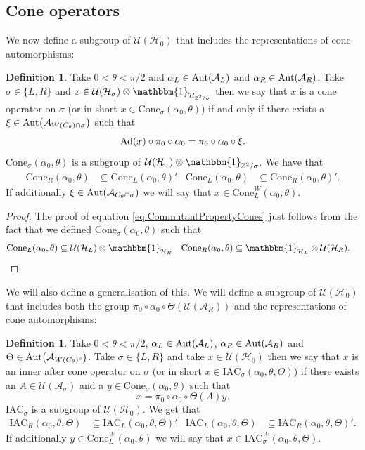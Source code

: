 \documentclass[12pt,a4paper,twoside]{article}
\newcommand{\IAC}{\textrm{IAC}}
\let\originalleft\left
\let\originalright\right
\renewcommand{\left}{\mathopen{}\mathclose\bgroup\originalleft}
\renewcommand{\right}{\aftergroup\egroup\originalright}
\newcommand{\UU}{\mathcal U}
\newcommand{\HH}{\mathcal H}
\newcommand{\ZZ}{\mathbb Z}
\renewcommand{\AA}{\mathcal A}
\newcommand{\id}{\mathbbm{1}}
\newcommand{\Ad}[1]{\textrm{Ad}\left(#1\right)}
\newcommand{\Aut}[1]{\textrm{Aut}\left(#1\right)}
\theoremstyle{definition}
\newtheorem{definition}[theorem]{Definition}
\numberwithin{equation}{section}
\begin{document}
\subsection{Cone operators}
 We now define a subgroup of $\UU(\HH_0)$ that includes the representations of cone automorphisms:
\begin{definition}\label{def:ConeOperators}
	Take $0<\theta<\pi/2$ and $\alpha_L\in\Aut{\AA_{L}}$ and $\alpha_R\in\Aut{\AA_{R}}$. Take $\sigma\in\{L,R\}$ and $x\in\UU(\HH_{\sigma})\otimes\id_{\HH_{\ZZ^2/\sigma}}$ then we say that $x$ is a cone operator on $\sigma$ (or in short $x\in\textrm{Cone}_{\sigma}(\alpha_0,\theta)$) if and only if there exists a $\xi\in\Aut{\AA_{W(C_\theta)\cap\sigma}}$ such that
	\begin{equation}
		\Ad{x}\circ\pi_0\circ\alpha_0=\pi_0\circ\alpha_0\circ\xi.
	\end{equation}
	$\textrm{Cone}_\sigma(\alpha_0,\theta)$ is a subgroup of $\UU(\HH_\sigma)\otimes\id_{\ZZ^2/\sigma}$. We have that
	\begin{align}\label{eq:CommutantPropertyCones}
		\textrm{Cone}_R(\alpha_0,\theta)&\subseteq\textrm{Cone}_L(\alpha_0,\theta)'&\textrm{Cone}_L(\alpha_0,\theta)&\subseteq\textrm{Cone}_R(\alpha_0,\theta)'.
	\end{align}
	If additionally $\xi\in\Aut{\AA_{C_\theta\cap\sigma}}$ we will say that $x\in\textrm{Cone}_L^W(\alpha_0,\theta)$.
\end{definition}
\begin{proof}
	The proof of equation \eqref{eq:CommutantPropertyCones} just follows from the fact that we defined $\textrm{Cone}_\sigma(\alpha_0,\theta)$ such that
	\begin{align}
		\textrm{Cone}_L(\alpha_0,\theta)&\subseteq \UU(\HH_L)\otimes\id_{\HH_R}&\textrm{Cone}_R(\alpha_0,\theta)&\subseteq \id_{\HH_L} \otimes \UU(\HH_R).
	\end{align}
\end{proof}
We will also define a generalisation of this. We will define a subgroup of $\UU(\HH_0)$ that includes both the group $\pi_0\circ\alpha_0\circ\Theta(\UU(\AA_R))$ and the representations of cone automorphisms:
\begin{definition}
	Take $0<\theta<\pi/2$, $\alpha_L\in\Aut{\AA_{L}}$, $\alpha_R\in\Aut{\AA_{R}}$ and $\Theta\in\Aut{\AA_{W(C_\theta)^c}}$. Take $\sigma\in\{L,R\}$ and take $x\in\UU(\HH_0)$ then we say that $x$ is an inner after cone operator on $\sigma$ (or in short $x\in \IAC_\sigma(\alpha_0,\theta,\Theta)$) if there exists an $A\in\UU(\AA_\sigma)$ and a $y\in\textrm{Cone}_\sigma(\alpha_0,\theta)$ such that
	\begin{equation}
		x=\pi_0\circ\alpha_0\circ\Theta(A)y.
	\end{equation}
	$\IAC_\sigma$ is a subgroup of $\UU(\HH_0)$. We get that
	\begin{align}\label{eq:CommutantProperty}
		\IAC_R(\alpha_0,\theta,\Theta)&\subseteq\IAC_L(\alpha_0,\theta,\Theta)'&\IAC_L(\alpha_0,\theta,\Theta)&\subseteq\IAC_R(\alpha_0,\theta,\Theta)'.
	\end{align}
	If additionally $y\in \textrm{Cone}_L^W(\alpha_0,\theta)$ we will say that $x\in \IAC_\sigma^W(\alpha_0,\theta,\Theta)$.
\end{definition}
\end{document}
